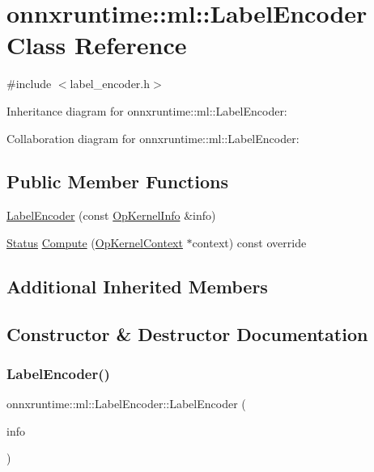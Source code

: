 \hypertarget{classonnxruntime_1_1ml_1_1LabelEncoder}{}\section{onnxruntime\+:\+:ml\+:\+:Label\+Encoder Class Reference}
\label{classonnxruntime_1_1ml_1_1LabelEncoder}


{\ttfamily \#include $<$label\+\_\+encoder.\+h$>$}



Inheritance diagram for onnxruntime\+:\+:ml\+:\+:Label\+Encoder\+:


Collaboration diagram for onnxruntime\+:\+:ml\+:\+:Label\+Encoder\+:
\subsection*{Public Member Functions}
\begin{DoxyCompactItemize}
\item 
\mbox{\hyperlink{classonnxruntime_1_1ml_1_1LabelEncoder_af95b24c22ebc8cf3854631a4010d632f}{Label\+Encoder}} (const \mbox{\hyperlink{classonnxruntime_1_1OpKernelInfo}{Op\+Kernel\+Info}} \&info)
\item 
\mbox{\hyperlink{classonnxruntime_1_1common_1_1Status}{Status}} \mbox{\hyperlink{classonnxruntime_1_1ml_1_1LabelEncoder_a931b45722e9ef023d416479e4246fc64}{Compute}} (\mbox{\hyperlink{classonnxruntime_1_1OpKernelContext}{Op\+Kernel\+Context}} $\ast$context) const override
\end{DoxyCompactItemize}
\subsection*{Additional Inherited Members}


\subsection{Constructor \& Destructor Documentation}
\mbox{\label{classonnxruntime_1_1ml_1_1LabelEncoder_af95b24c22ebc8cf3854631a4010d632f}} 
\subsubsection{\texorpdfstring{Label\+Encoder()}{LabelEncoder()}}
{\footnotesize\ttfamily onnxruntime\+::ml\+::\+Label\+Encoder\+::\+Label\+Encoder (\begin{DoxyParamCaption}\item[{const \mbox{\hyperlink{classonnxruntime_1_1OpKernelInfo}{Op\+Kernel\+Info}} \&}]{info }\end{DoxyParamCaption})\hspace{0.3cm}{\ttfamily [inline]}}



